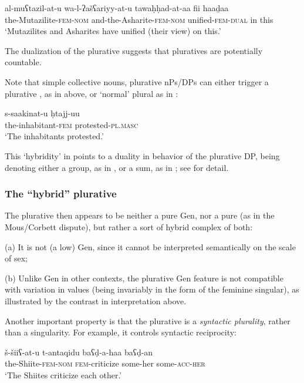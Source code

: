 \begin{exe}
  \ex\label{ex:fassi:25}
  \gll al-muʕtazil-at-u wa-l-ʔa\v{s}ʕariyy-at-u tawa\d{h}\d{h}ad-at-aa fii haa\b{d}aa\\
  the-Mutazilite-\textsc{fem-nom} and-the-Asharite-\textsc{fem-nom} unified-\textsc{fem-dual} in this\\
  \glt `Mutazilites and Asharites have unified (their view) on this.'\\
\end{exe}
%
The dualization of the plurative suggests that pluratives are potentially
countable.

Note that simple collective nouns, plurative nPs/DPs can either trigger a plurative , as in  above, or `normal' plural  as in :

\begin{exe}
  \ex\label{ex:fassi:26}
  \gll s-saakinat-u \d{h}tajj-uu\\
  the-inhabitant-\textsc{fem} protested-\textsc{pl.masc}\\
  \glt `The inhabitants protested.'\\
\end{exe}
%
This `hybridity' in  points to a duality in behavior of the plurative
DP, being denoting either a group, as in , or a sum, as in
; see \citet{FassiFehri2012,FassiFehri2016} for detail.

\subsubsection{The ``hybrid'' plurative}

The plurative then appears to be neither a pure Gen, nor a pure  (as in the
Mous/Corbett dispute), but rather a sort of hybrid complex of both:

(a) It is not (a low) Gen, since it cannot be interpreted semantically on the
scale of sex;

(b) Unlike Gen in other contexts, the plurative Gen feature is not compatible
with variation in  values (being invariably in the form of the feminine
singular), as illustrated by the contrast in interpretation above.

Another important property is that the plurative is a \textit{syntactic
plurality}, rather than a singularity. For example, it controls syntactic
reciprocity:

\begin{exe}
  \ex\label{ex:fassi:27}
  \gll \v{s}-\v{s}iiʕ-at-u t-antaqidu baʕ\d{d}-a-haa baʕ\d{d}-an\\
  the-Shiite-\textsc{fem-nom} \textsc{fem}-criticize some-her some-\textsc{acc-her}\\
  \glt `The Shiites criticize each other.'\\
\end{exe}

